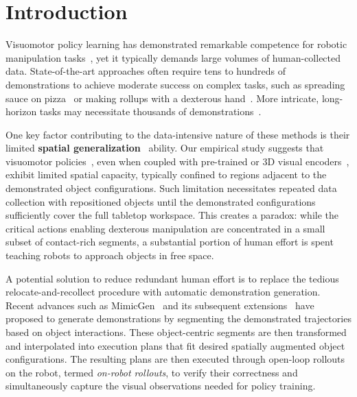 \section{Introduction}

Visuomotor policy learning has demonstrated remarkable competence for robotic manipulation tasks~\cite{chi2023diffusion_policy,zhao2023learning,fu2024mobile,ze20243d}, yet it typically demands large volumes of human-collected data. State-of-the-art approaches often require tens to hundreds of demonstrations to achieve moderate success on complex tasks, such as spreading sauce on pizza~\cite{chi2023diffusion_policy} or making rollups with a dexterous hand~\cite{ze20243d}. More intricate, long-horizon tasks may necessitate thousands of demonstrations~\cite{zhao2024aloha}.

One key factor contributing to the data-intensive nature of these methods is their limited \textbf{spatial generalization}~\cite{saxena2024what,tan2024manibox} ability. 
Our empirical study suggests that visuomotor policies~\cite{chi2023diffusion_policy}, even when coupled with pre-trained or 3D visual encoders~\cite{nair2023r3m,radford2021learning,oquab2023dinov2,ze20243d}, exhibit limited spatial capacity, typically confined to regions adjacent to the demonstrated object configurations. 
Such limitation necessitates repeated data collection with repositioned objects until the demonstrated configurations sufficiently cover the full tabletop workspace. 
This creates a paradox: while the critical actions enabling dexterous manipulation are concentrated in a small subset of contact-rich segments, a substantial portion of human effort is spent teaching robots to approach objects in free space.

A potential solution to reduce redundant human effort is to replace the tedious relocate-and-recollect procedure with automatic demonstration generation. 
Recent advances such as MimicGen~\cite{mandlekar2023mimicgen} and its subsequent extensions~\cite{hoque2024intervengen,garrett2024skillmimicgen,jiang2024dexmimicgen} have proposed to generate demonstrations by segmenting the demonstrated trajectories based on object interactions. 
These object-centric segments are then transformed and interpolated into execution plans that fit desired spatially augmented object configurations. 
The resulting plans are then executed through open-loop rollouts on the robot, termed \textit{on-robot rollouts}, to verify their correctness and simultaneously capture the visual observations needed for policy training.

